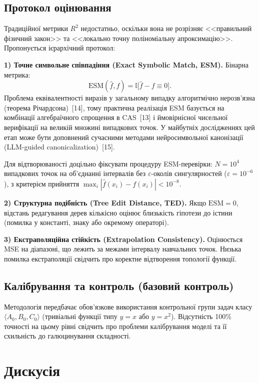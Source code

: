 \documentclass[11pt]{article}
\begin{document}
\subsection{Протокол оцінювання}

Традиційної метрики $R^2$ недостатньо, оскільки вона не розрізняє <<правильний фізичний закон>> та <<локально точну поліноміальну апроксимацію>>. Пропонується ієрархічний протокол:

\textbf{1) Точне символьне співпадіння (Exact Symbolic Match, ESM).}
Бінарна метрика:
\[
\mathrm{ESM}(\hat{f},f)=\mathbb{I}\big[\hat{f}-f\equiv 0\big].
\]
Проблема еквівалентності виразів у загальному випадку алгоритмічно нерозв'язна (теорема Річардсона)~[14], тому практична реалізація ESM базується на комбінації алгебраїчного спрощення в CAS~[13] і ймовірнісної чисельної верифікації на великій множині випадкових точок. У майбутніх дослідженнях цей етап може бути доповнений сучасними методами нейросимвольної канонізації (LLM-guided canonicalization)~[15].

Для відтворюваності доцільно фіксувати процедуру ESM-перевірки: $N=10^4$ випадкових точок на об'єднанні інтервалів без $\varepsilon$-околів сингулярностей ($\varepsilon=10^{-6}$), з критерієм прийняття $\max_i|\hat f(x_i)-f(x_i)|<10^{-8}$.

\textbf{2) Структурна подібність (Tree Edit Distance, TED).}
Якщо $\mathrm{ESM}=0$, відстань редагування дерев кількісно оцінює близькість гіпотези до істини (помилка у константі, знаку або окремому операторі).

\textbf{3) Екстраполяційна стійкість (Extrapolation Consistency).}
Оцінюється MSE на діапазоні, що лежить за межами інтервалу навчальних точок. Низька помилка екстраполяції свідчить про коректне відтворення топології функції.

\subsection{Калібрування та контроль (базовий контроль)}

Методологія передбачає обов'язкове використання контрольної групи задач класу $\langle A_0,B_0,C_0\rangle$ (тривіальні функції типу $y=x$ або $y=x^2$). Відсутність 100\% точності на цьому рівні свідчить про проблеми калібрування моделі та її схильність до галюцинування складності.

\section{Дискусія}
\end{document}

